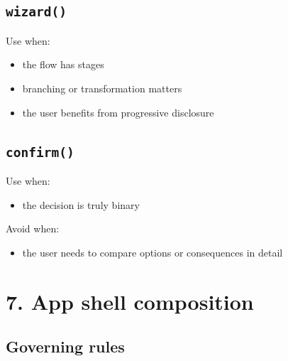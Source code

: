 \subsection{\texorpdfstring{\texttt{w\allowbreak{}i\allowbreak{}z\allowbreak{}a\allowbreak{}r\allowbreak{}d\allowbreak{}(\allowbreak{})}}{}}\label{record-023-wizard}

Use when:

\begin{itemize}
\tightlist
\item
  the flow has stages
\item
  branching or transformation matters
\item
  the user benefits from progressive disclosure
\end{itemize}

\subsection{\texorpdfstring{\texttt{c\allowbreak{}o\allowbreak{}n\allowbreak{}f\allowbreak{}i\allowbreak{}r\allowbreak{}m\allowbreak{}(\allowbreak{})}}{}}\label{record-023-confirm}

Use when:

\begin{itemize}
\tightlist
\item
  the decision is truly binary
\end{itemize}

Avoid when:

\begin{itemize}
\tightlist
\item
  the user needs to compare options or consequences in detail
\end{itemize}

\section{7. App shell composition}\label{record-023-app-shell-composition}

\subsection{Governing rules}\label{record-023-governing-rules-2}

